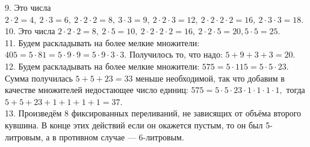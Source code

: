 \documentclass[12pt]{article}
\begin{document}
9. Это числа $2\cdot2=4,\ 2\cdot3=6,\ 2\cdot2\cdot2=8,\ 3\cdot3=9,\ 2\cdot2\cdot3=12,\ 2\cdot2\cdot2\cdot2=16,\ 2\cdot3\cdot3=18.$\\
10. Это числа $2\cdot2\cdot2=8,\ 2\cdot5=10,\ 2\cdot2\cdot2\cdot2=16,\ 2\cdot2\cdot5=20, 5\cdot5=25.$\\
11. Будем раскладывать на более мелкие множители: $405=5\cdot81=5\cdot9\cdot9=5\cdot9\cdot3\cdot3.$ Получилось то, что надо: $5+9+3+3=20.$\\
12. Будем раскладывать на более мелкие множители: $575=5\cdot115=5\cdot5\cdot23.$ Сумма получилась $5+5+23=33$ меньше необходимой, так что добавим в качестве множителей недостающее число единиц: $575=5\cdot5\cdot23\cdot1\cdot1\cdot1\cdot1,$ тогда $5+5+23+1+1+1+1=37.$\\
13. Произведём 8 фиксированных переливаний, не зависящих от объёма второго кувшина. В конце этих действий если он окажется пустым, то он был 5-литровым, а в противном случае --- 6-литровым.
\begin{center}
\begin{figure}[h!]
\end{figure}
\end{center}
\end{document}
